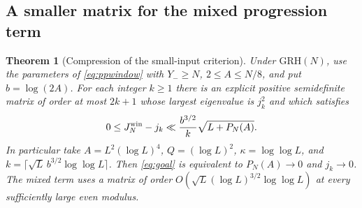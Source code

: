 \documentclass[11pt,a4paper]{article}
\numberwithin{equation}{section}
\newtheorem{theorem}{Theorem}[section]
\newcommand{\grh}{\mathrm{GRH}}
\begin{document}
\subsection{A smaller matrix for the mixed progression term}

\begin{theorem}[Compression of the small-input criterion]
\label{thm:small-input-gram}
Under $\grh(N)$, use the parameters of \eqref{eq:ppwindow} with
$Y_-\ge N$, $2\le A\le N/8$, and put $b=\log(2A)$.
For each integer $k\ge1$ there is an explicit positive semidefinite matrix
of order at most $2k+1$ whose largest eigenvalue is $j_k^2$ and
which satisfies
\begin{equation}
 0\le J_N^{\rm win}-j_k
   \ll \frac{b^{3/2}}{k}\sqrt{L+P_N(A)} .
 \label{eq:small-input-gram}
\end{equation}
In particular take $A=L^2(\log L)^4$, $Q=(\log L)^2$,
$\kappa=\log\log L$, and
$k=\lceil\sqrt L\,b^{3/2}\log\log L\rceil$.
Then \eqref{eq:goal} is equivalent to
$P_N(A)\to0$ and $j_k\to0$. The mixed term uses a matrix of
order $O(\sqrt L(\log L)^{3/2}\log\log L)$ at every sufficiently
large even modulus.
\end{theorem}
\end{document}

